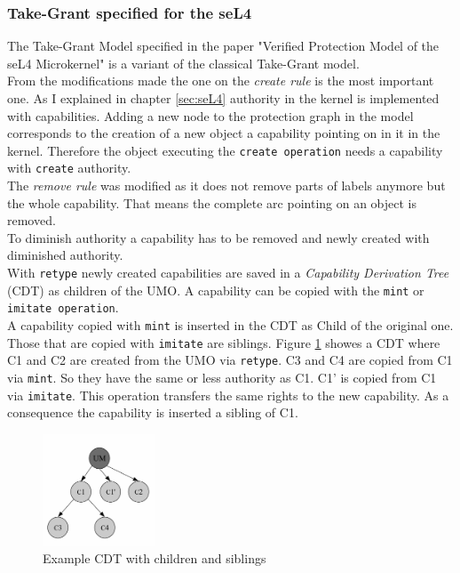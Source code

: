 \subsubsection{Take-Grant specified for the seL4}\label{specT}
The Take-Grant Model specified in the paper "Verified Protection Model of the seL4 Microkernel" \cite{TakeG} is a variant of the classical Take-Grant model. \\
From the modifications made the one on the \textit{create rule} is the most important one. As I explained in chapter \ref{sec:seL4} authority in the kernel is implemented with capabilities. Adding a new node to the protection graph in the model corresponds to the creation of a new object a capability pointing on in it in the kernel. Therefore the object executing the \texttt{create operation} needs a capability with \texttt{create} authority. \\
The \textit{remove rule} was modified as it does not remove parts of labels anymore but the whole capability. That means the complete arc pointing on an object is removed. \\
To diminish authority a capability has to be removed and newly created with diminished authority. \\
With \texttt{retype} newly created capabilities are saved in a \textit{Capability Derivation Tree} (CDT) as children of the UMO. A capability can be copied with the \texttt{mint} or \texttt{imitate operation}. \\ 
A capability  copied with \texttt{mint} is inserted in the CDT as Child of the original one. Those that are copied with \texttt{imitate} are siblings. Figure \ref{fig:cdt} showes a CDT where C1 and C2 are created from the UMO via \texttt{retype}. C3 and C4 are copied from C1 via \texttt{mint}. So they have the same or less authority as C1. C1' is copied from C1 via \texttt{imitate}. This operation transfers the same rights to the new capability. As a consequence the capability is inserted a sibling of C1. \\
	\begin{figure}[H]
	\centering
	\includegraphics[width=0.3\textwidth]{./Pictures/CDT.jpg}
	\caption[CDT]{Example CDT with children and siblings \cite{PhDseL4}}
	\label{fig:cdt}
	\end{figure}
